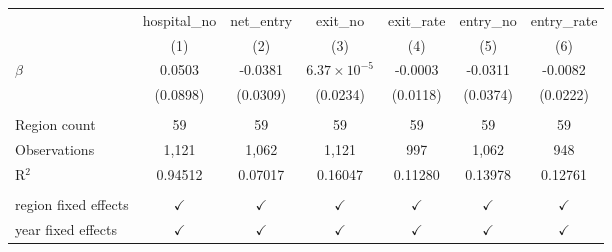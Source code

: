 \begingroup
\centering
\begin{tabular}{lcccccc}
   \toprule
                        & hospital\_no  & net\_entry    & exit\_no              & exit\_rate    & entry\_no     & entry\_rate\\   
                        & (1)           & (2)           & (3)                   & (4)           & (5)           & (6)\\  
   \midrule 
   $\beta$              & 0.0503        & -0.0381       & $6.37\times 10^{-5}$  & -0.0003       & -0.0311       & -0.0082\\   
                        & (0.0898)      & (0.0309)      & (0.0234)              & (0.0118)      & (0.0374)      & (0.0222)\\   
    \\
   Region count         & 59           & 59           & 59           & 59           & 59           & 59\\
   Observations         & 1,121         & 1,062         & 1,121                 & 997           & 1,062         & 948\\  
   R$^2$                & 0.94512       & 0.07017       & 0.16047               & 0.11280       & 0.13978       & 0.12761\\  
    \\
   region fixed effects & $\checkmark$  & $\checkmark$  & $\checkmark$          & $\checkmark$  & $\checkmark$  & $\checkmark$\\   
   year fixed effects   & $\checkmark$  & $\checkmark$  & $\checkmark$          & $\checkmark$  & $\checkmark$  & $\checkmark$\\   
   \bottomrule
\end{tabular}
\par\endgroup
